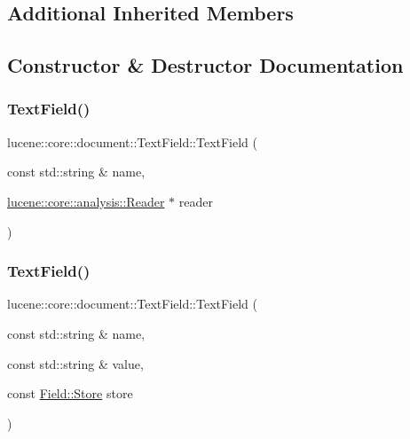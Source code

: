 \subsection*{Additional Inherited Members}


\subsection{Constructor \& Destructor Documentation}
\mbox{\label{classlucene_1_1core_1_1document_1_1TextField_a2b7a587298cd4f15df081de5ef1c868a}} 
\subsubsection{\texorpdfstring{Text\+Field()}{TextField()}\hspace{0.1cm}{\footnotesize\ttfamily [1/4]}}
{\footnotesize\ttfamily lucene\+::core\+::document\+::\+Text\+Field\+::\+Text\+Field (\begin{DoxyParamCaption}\item[{const std\+::string \&}]{name,  }\item[{\mbox{\hyperlink{classlucene_1_1core_1_1analysis_1_1Reader}{lucene\+::core\+::analysis\+::\+Reader}} $\ast$}]{reader }\end{DoxyParamCaption})\hspace{0.3cm}{\ttfamily [inline]}}

\mbox{\label{classlucene_1_1core_1_1document_1_1TextField_a240a22520ea651981c9ee78d5e3bc5d8}} 
\subsubsection{\texorpdfstring{Text\+Field()}{TextField()}\hspace{0.1cm}{\footnotesize\ttfamily [2/4]}}
{\footnotesize\ttfamily lucene\+::core\+::document\+::\+Text\+Field\+::\+Text\+Field (\begin{DoxyParamCaption}\item[{const std\+::string \&}]{name,  }\item[{const std\+::string \&}]{value,  }\item[{const \mbox{\hyperlink{classlucene_1_1core_1_1document_1_1Field_a7d5d79f0c56d3548ab8d46d0e7dae35d}{Field\+::\+Store}}}]{store }\end{DoxyParamCaption})\hspace{0.3cm}{\ttfamily [inline]}}

